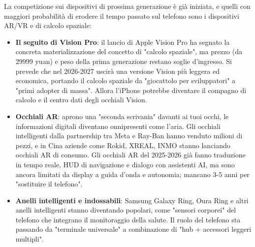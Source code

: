 


La competizione sui dispositivi di prossima generazione è già iniziata, e quelli con maggiori probabilità di erodere il tempo passato sul telefono sono i dispositivi AR/VR e di calcolo spaziale:

\begin{itemize}
  \item \textbf{Il seguito di Vision Pro}: il lancio di Apple Vision Pro ha segnato la concreta materializzazione del concetto di "calcolo spaziale", ma prezzo (da 29999 yuan) e peso della prima generazione restano soglie d'ingresso. Si prevede che nel 2026-2027 uscirà una versione Vision più leggera ed economica, portando il calcolo spaziale da "giocattolo per sviluppatori" a "primi adopter di massa". Allora l'iPhone potrebbe diventare il compagno di calcolo e il centro dati degli occhiali Vision.
  \item \textbf{Occhiali AR}: aprono una "seconda scrivania" davanti ai tuoi occhi, le informazioni digitali diventano onnipresenti come l'aria. Gli occhiali intelligenti dalla partnership tra Meta e Ray-Ban hanno venduto milioni di pezzi, e in Cina aziende come Rokid, XREAL, INMO stanno lanciando occhiali AR di consumo. Gli occhiali AR del 2025-2026 già fanno traduzione in tempo reale, HUD di navigazione e dialogo con assistenti AI, ma sono ancora limitati da display a guida d'onda e autonomia; mancano 3-5 anni per "sostituire il telefono".
  \item \textbf{Anelli intelligenti e indossabili}: Samsung Galaxy Ring, Oura Ring e altri anelli intelligenti stanno diventando popolari, come "sensori corporei" del telefono che integrano il monitoraggio della salute. Il ruolo del telefono sta passando da "terminale universale" a combinazione di "hub + accessori leggeri multipli".
\end{itemize}


